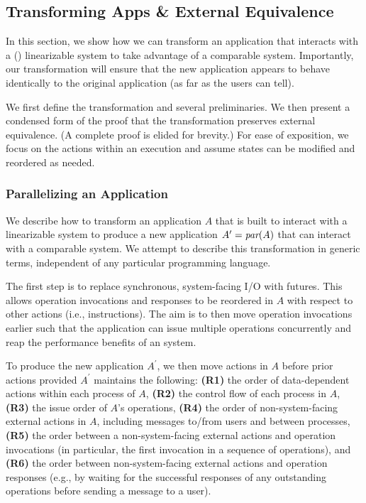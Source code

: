 \subsection{Transforming Apps \& External Equivalence}
\label{sec:mdl:equivalence}

In this section, we show how we can transform an application that interacts with
a (\singledispatch{}) linearizable system to take advantage of a comparable
\multidispatch{} system. Importantly, our transformation will ensure that the new
application appears to behave identically to the original application (as far as
the users can tell).

We first define the transformation and several preliminaries. We then
present a condensed form of the proof that the transformation preserves external
equivalence. (A complete proof is elided for brevity.) For ease of exposition, we focus on the actions within an
execution and assume states can be modified and reordered as needed.

\subsubsection{Parallelizing an Application}
\label{sec:mdl:transform}

We describe how to transform an application $A$ that is built to
interact with a linearizable system to produce a new application
$A^\prime = \operatorname*{\textit{par}}(A)$ that can interact with a comparable \MDL{} system.
We attempt to describe this transformation in generic terms, independent of any particular programming language.

The first step is to replace synchronous, system-facing I/O with
futures. This allows operation invocations and responses
to be reordered in $A$ with respect to other actions (i.e., instructions).
The aim is to then move operation invocations earlier such that the application
can issue multiple operations concurrently and reap the performance benefits 
of an \MDL{} system.

To produce the new application $A^\prime$, we then move actions in $A$ before prior 
actions provided $A^\prime$ maintains the following:
\textbf{(R1)} the order of data-dependent actions within
each process of $A$,
\textbf{(R2)} the control flow of each process in $A$,
\textbf{(R3)} the issue order of $A$'s operations,
\textbf{(R4)} the order of non-system-facing external
actions in $A$, including messages to/from users and between processes,
\textbf{(R5)} the order between a non-system-facing external 
actions and operation invocations (in particular, the first invocation in a
sequence of operations), and
\textbf{(R6)} the order between non-system-facing external actions and operation responses (e.g., by waiting for the successful responses of any outstanding operations before sending a message to a user).

